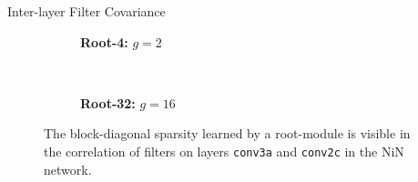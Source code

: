 \documentclass[t,xcolor=dvipsnames]{beamer}
\begin{document}
\begin{frame}{Inter-layer Filter Covariance}
\begin{figure}[tb]
\begin{subfigure}[b]{0.31\linewidth}
    \caption{\textbf{Root-4:} $g=2$}
    \label{fig:root4}
\end{subfigure}
~
\begin{subfigure}[b]{0.31\linewidth}
\centering
    \caption{\textbf{Root-32:} $g=16$}
    \label{fig:root32corr}
\end{subfigure}
\caption{The block-diagonal sparsity learned by a root-module is visible in the correlation of filters on layers \texttt{conv3a} and \texttt{conv2c} in the NiN network.}
\label{fig:covar}
\end{figure}
\end{frame}
\end{document}
